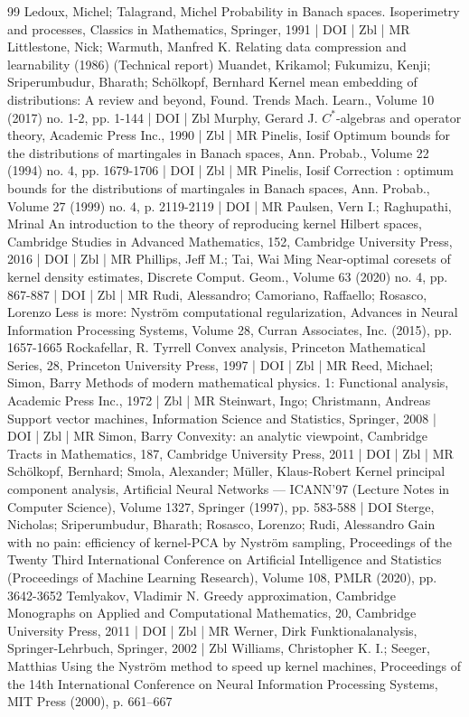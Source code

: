 \documentclass[10pt]{amsart}
\theoremstyle{definition}\newtheorem{defi}[theo]{Definition}\newtheorem{rema}[theo]{Remark}\newtheorem{exam}[theo]{Example}\newtheorem{exem}[theo]{Example}\newtheorem{nota}[theo]{Notation}
\theoremstyle{remark}
\begin{document}
\begin{thebibliography}{99}
Ledoux, Michel; Talagrand, Michel Probability in Banach spaces. Isoperimetry and processes, Classics in Mathematics, Springer, 1991 | DOI | Zbl | MR
Littlestone, Nick; Warmuth, Manfred K. Relating data compression and learnability (1986) (Technical report)
Muandet, Krikamol; Fukumizu, Kenji; Sriperumbudur, Bharath; Schölkopf, Bernhard Kernel mean embedding of distributions: A review and beyond, Found. Trends Mach. Learn., Volume 10 (2017) no. 1-2, pp. 1-144 | DOI | Zbl
Murphy, Gerard J. ${C}^*$-algebras and operator theory, Academic Press Inc., 1990 | Zbl | MR
Pinelis, Iosif Optimum bounds for the distributions of martingales in Banach spaces, Ann. Probab., Volume 22 (1994) no. 4, pp. 1679-1706 | DOI | Zbl | MR
Pinelis, Iosif Correction : optimum bounds for the distributions of martingales in Banach spaces, Ann. Probab., Volume 27 (1999) no. 4, p. 2119-2119 | DOI | MR
Paulsen, Vern I.; Raghupathi, Mrinal An introduction to the theory of reproducing kernel Hilbert spaces, Cambridge Studies in Advanced Mathematics, 152, Cambridge University Press, 2016 | DOI | Zbl | MR
Phillips, Jeff M.; Tai, Wai Ming Near-optimal coresets of kernel density estimates, Discrete Comput. Geom., Volume 63 (2020) no. 4, pp. 867-887 | DOI | Zbl | MR
Rudi, Alessandro; Camoriano, Raffaello; Rosasco, Lorenzo Less is more: Nyström computational regularization, Advances in Neural Information Processing Systems, Volume 28, Curran Associates, Inc. (2015), pp. 1657-1665
Rockafellar, R. Tyrrell Convex analysis, Princeton Mathematical Series, 28, Princeton University Press, 1997 | DOI | Zbl | MR
Reed, Michael; Simon, Barry Methods of modern mathematical physics. 1: Functional analysis, Academic Press Inc., 1972 | Zbl | MR
Steinwart, Ingo; Christmann, Andreas Support vector machines, Information Science and Statistics, Springer, 2008 | DOI | Zbl | MR
Simon, Barry Convexity: an analytic viewpoint, Cambridge Tracts in Mathematics, 187, Cambridge University Press, 2011 | DOI | Zbl | MR
Schölkopf, Bernhard; Smola, Alexander; Müller, Klaus-Robert Kernel principal component analysis, Artificial Neural Networks — ICANN’97 (Lecture Notes in Computer Science), Volume 1327, Springer (1997), pp. 583-588 | DOI
Sterge, Nicholas; Sriperumbudur, Bharath; Rosasco, Lorenzo; Rudi, Alessandro Gain with no pain: efficiency of kernel-PCA by Nyström sampling, Proceedings of the Twenty Third International Conference on Artificial Intelligence and Statistics (Proceedings of Machine Learning Research), Volume 108, PMLR (2020), pp. 3642-3652
Temlyakov, Vladimir N. Greedy approximation, Cambridge Monographs on Applied and Computational Mathematics, 20, Cambridge University Press, 2011 | DOI | Zbl | MR
Werner, Dirk Funktionalanalysis, Springer-Lehrbuch, Springer, 2002 | Zbl
Williams, Christopher K. I.; Seeger, Matthias Using the Nyström method to speed up kernel machines, Proceedings of the 14th International Conference on Neural Information Processing Systems, MIT Press (2000), p. 661–667
\end{thebibliography}
\end{document}
